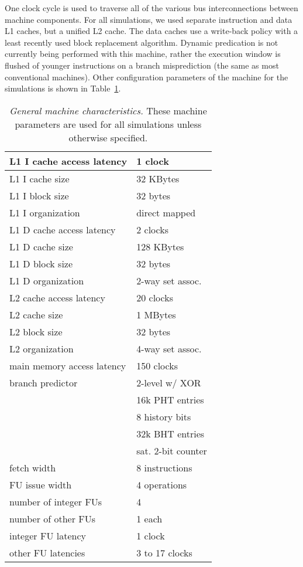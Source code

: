 \documentclass[10pt,dvips]{article}
\begin{document}
One clock cycle is used to traverse all of the
various bus interconnections between machine components.
For all simulations, we used separate instruction and
data L1 caches, but a unified L2 cache.
The data caches use a write-back policy with a least recently used
block replacement algorithm.
Dynamic predication is not
currently being performed with this machine, rather
the execution window is flushed of younger instructions
on a branch misprediction (the same as most conventional machines).
Other configuration parameters of the machine for the
simulations is shown in Table~\ref{tab:baseline}.

%
\begin{table}
\begin{center}
\caption{{\em General machine characteristics.}
These machine parameters are used for all simulations
unless otherwise specified.}
\label{tab:baseline}
\scriptsize{
\begin{tabular}{|l|l|}
\hline 
L1 I cache access latency&1 clock\\
\hline
L1 I cache size&32 KBytes\\
\hline
L1 I block size&32 bytes\\
\hline
L1 I organization&direct mapped\\
%
\hline 
L1 D cache access latency&2 clocks\\
\hline
L1 D cache size&128 KBytes\\
\hline
L1 D block size&32 bytes\\
\hline
L1 D organization&2-way set assoc.\\
%
\hline
L2 cache access latency&20 clocks\\
\hline
L2 cache size&1 MBytes\\
\hline
L2 block size&32 bytes\\
\hline
L2 organization&4-way set assoc.\\
%
\hline
main memory access latency&150 clocks\\
\hline
branch predictor&2-level w/ XOR\\
\cline{2-2}
 & 16k PHT entries\\
\cline{2-2}
 & 8 history bits\\
\cline{2-2}
 & 32k BHT entries\\
\cline{2-2}
 & sat. 2-bit counter\\
\hline
fetch width & 8 instructions \\
\hline
FU issue width & 4 operations \\
\hline
number of integer FUs & 4 \\
\hline
number of other FUs & 1 each \\
\hline
integer FU latency & 1 clock \\
\hline
other FU latencies & 3 to 17 clocks \\
\hline 
\end{tabular}
}
\end{center}
\end{table}
%
\end{document}
